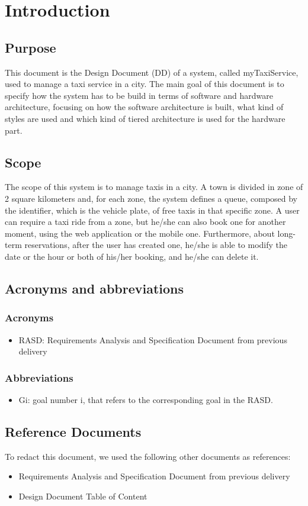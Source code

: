 \section{Introduction}
\subsection{Purpose}
	This document is the Design Document (DD) of a system, called myTaxiService, used to manage  a taxi service in a city. The main goal of this document is to specify how the system has to be build in terms of software and hardware architecture, focusing on how the software architecture is built, what kind of styles are used and which kind of tiered architecture is used for the hardware part.
\subsection{Scope}
	The scope of this system is to manage taxis in a city. A town is divided in zone of 2 square kilometers and, for each zone, the system defines a queue, composed by the identifier, which is the vehicle plate, of free taxis in that specific zone. A user can require a taxi ride from a zone, but he/she can also book one for another moment, using the web application or the mobile one. Furthermore, about long-term reservations, after the user has created one, he/she is able to modify the date or the hour or both of his/her booking, and he/she can delete it. 
\subsection{Acronyms and abbreviations}
	\subsubsection{Acronyms}
		 \begin{itemize}
		 	\item RASD: Requirements Analysis and Specification Document from previous delivery
		 \end{itemize}
	\subsubsection{Abbreviations}
		\begin{itemize}
			\item Gi: goal number i, that refers to the corresponding goal in the RASD.
		\end{itemize}
\subsection{Reference Documents}
	To redact this document, we used the following other documents as references:
	\begin{itemize}
		\item Requirements Analysis and Specification Document from previous delivery
		\item Design Document Table of Content 
	\end{itemize}
